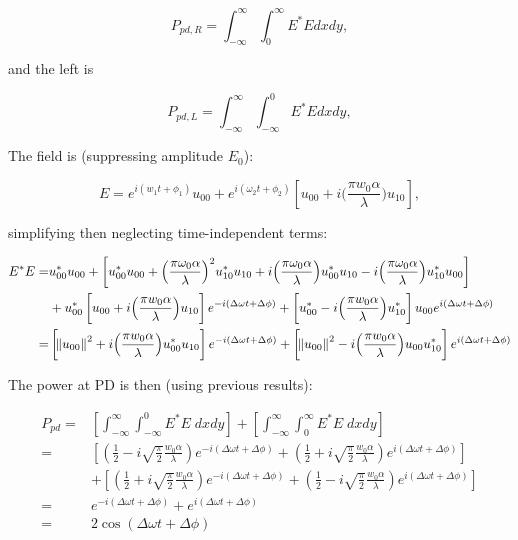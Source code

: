 \documentclass[aps,twoside,secnumarabic,balancelastpage,amsmath,amssymb,nofootinbib,hyperref=pdftex]{revtex4}
\newcommand{\bigfrac}[2]{\Big( \frac{#1}{#2}\Big)}
\begin{document}
\begin{equation*}
P_{pd,R} = \int_{-\infty}^{\infty}\int_{0}^{\infty} E^* E dx dy,
\end{equation*}

and the left is

 \begin{equation*}
P_{pd,L} = \int_{-\infty}^{\infty}\int_{-\infty}^{0} E^* E dx dy,
\end{equation*}

The field is (suppressing amplitude $E_0$):

\begin{equation}
E = e^{i(w_{1}t + \phi_1)} u_{00} 
+ 
e^{i(\omega_{2}t + \phi_2)}
\left[
 u_{00}
 +
 i\bigfrac{\pi w_0 \alpha}{\lambda} u_{10}
 \right],
\end{equation}

simplifying then neglecting time-independent terms:

\begin{align*}
	E^{*}E = &
    	u_{00}^*u_{00}
		+\left[
			u_{00}^* u_{00} + \bigfrac{\pi \omega_0 \alpha}{\lambda}^2 u_{10}^*u_{10}+ i \bigfrac{\pi \omega_0 \alpha}{\lambda} u_{00}^* u_{10} - i \bigfrac{\pi \omega_0 \alpha}{\lambda} u_{10}^* u_{00} 
		\right]
		\\&
			+ 
			u_{00}^*
			\left[
			u_{00}
 		+
 			i\bigfrac{\pi w_0 \alpha}{\lambda} u_{10}
			\right]
			e^{-i(\Delta \omega t + \Delta \phi)}
		+
			\left[
			u_{00}^*
 -
 i\bigfrac{\pi w_0 \alpha}{\lambda} u_{10}^*
			\right]
			u_{00}
			e^{i(\Delta \omega t + \Delta \phi)}
	\\=&
			\left[
			\norm{u_{00}}^2
 		+
 			i\bigfrac{\pi w_0 \alpha}{\lambda} u_{00}^* u_{10}
			\right]
			e^{-i(\Delta \omega t + \Delta \phi)}
		+
			\left[
			\norm{u_{00}}^2
		 -
 			i\bigfrac{\pi w_0 \alpha}{\lambda} u_{00} u_{10}^*
			\right]
			e^{i(\Delta \omega t + \Delta \phi)}
\end{align*}

The power at PD is then (using previous results):

\begin{align*}
P_{pd} = & 
	\left[
	\int_{-\infty}^{\infty}\int_{-\infty}^{0} E^* E \;			dx dy
	\right]
	 + 
	 \left[
	 \int_{-\infty}^{\infty}\int_{0}^{\infty} E^* E \; 	dx dy
	 \right]
	\\=&
	\left[
	(
		\frac{1}{2}-i\sqrt{\frac{\pi}{2}} \frac{w_0 \alpha}{\lambda} 
		)
		e^{-i(\Delta \omega t + \Delta \phi)}
		+
	(
		\frac{1}{2}+i\sqrt{\frac{\pi}{2}} \frac{w_0 \alpha}{\lambda} 
		)		
		e^{i(\Delta \omega t + \Delta \phi)}			
	\right]
	\\&+
		\left[
	(
		\frac{1}{2}+i\sqrt{\frac{\pi}{2}} \frac{w_0 \alpha}{\lambda} 
		)
		e^{-i(\Delta \omega t + \Delta \phi)}
		+
	(
		\frac{1}{2}-i\sqrt{\frac{\pi}{2}} \frac{w_0 \alpha}{\lambda} 
		)		
		e^{i(\Delta \omega t + \Delta \phi)}			
	\right]
\\=&
	e^{-i(\Delta \omega t + \Delta \phi)}	
	+
	e^{i(\Delta \omega t + \Delta \phi)}	
\\=&
2 \cos (\Delta \omega t + \Delta \phi)
\end{align*}
\end{document}
